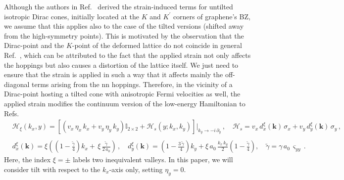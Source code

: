 \documentclass[aps,prb, onecolumn, nofootinbib, citeautoscript,10pt]{revtex4-2}
\newcommand{\red}[1]{{\color{red}#1}}
\newcommand{\bs}[1]{\boldsymbol{#1}}
\def \nn{\nonumber \\}
\begin{document}
Although the authors in Ref.~\cite{strained-dirac-franz} derived the strain-induced terms for untilted isotropic Dirac cones, initially located at the $K$ and $K^\prime $ corners of graphene's BZ, we assume that this applies also to the case of the tilted versions (shifted away from the high-symmetry points). This is motivated by the observation that the Dirac-point and the $K$-point of the deformed
lattice do not coincide in general Ref.~\cite{neto-strain-graphene}, which can be attributed to the fact that the applied strain not only affects the hoppings but also causes a distortion of the lattice itself. We just need to ensure that the strain \red{is applied} in such a way that it affects mainly the off-diagonal terms arising from the nn hoppings. Therefore, in the vicinity of a Dirac-point hosting a tilted cone with anisotropic Fermi velocities as well, the applied strain modifies the continuum version of the low-energy Hamiltonian to Refs.~\cite{strained-dirac-franz, complex-LL-strained-graphene}
\begin{align}
\label{eqhtot}
& \mathcal H_\xi (k_x, y) = \left[ 
\left(v_x \, \eta_x \, k_x + v_y \,\eta_y\, k_y \right)  {\mathbb I}_{2\times 2} 
+ \mathcal{H}_s(y; k_x, k_y) \right ]\big \vert_{k_y \rightarrow -i\, \partial_y}
\,, \quad 
\mathcal{H}_s  = v_x \, d^\xi_x (\bs k)\,\sigma_x + v_y\,d^\xi_y (\bs k)\,\sigma_y  \,, \nn &
\nn & d^\xi_x(\boldsymbol{k}) = \xi \left( \left (1 - \frac{ \tilde \gamma} {4}\right ) {k}_x 
+\, \xi \, \frac{ \tilde \gamma} {2\, a_0}\right)  \,,
\quad  d^\xi_y(\boldsymbol{k}) =
\left (1 - \frac{3\, \tilde \gamma } {4} \right )  k_y 
+ \xi\, a_0\,\frac{ k_x \, k_y}{2} \left (1 - \frac{\tilde \gamma} {4}  \right ) ,
\quad \tilde \gamma = \gamma\,a_0 \, \varsigma_{yy}\,.
\end{align}
Here, the index $\xi =\pm$ labels two inequivalent valleys. In this paper, we will consider tilt with respect to the $k_x$-axis only, setting $\eta_y = 0 $.
\end{document}
